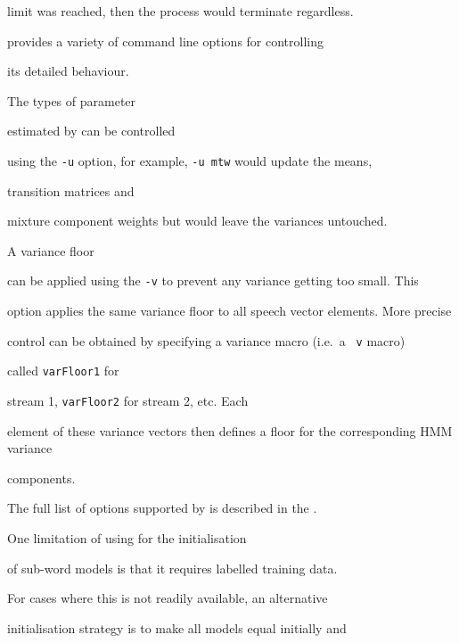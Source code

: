 limit was reached, then the process would terminate regardless.





 provides a variety of command line options for controlling 


its detailed behaviour.




The types of parameter 


estimated by  can be controlled


using the \texttt{-u} option, for example, \texttt{-u mtw} would update the means, 


transition matrices and


mixture component weights but would leave the variances untouched.  


A variance floor


can be applied using the \texttt{-v} to prevent any variance getting too small.   This


option applies the same variance floor to all speech vector elements.  More precise


control can be obtained by specifying a variance macro (i.e.\ a \texttt{~v} macro)


called \texttt{varFloor1} for 


stream 1, \texttt{varFloor2} for stream 2, etc.  Each


element of these variance vectors then defines a floor for the corresponding HMM variance


components.





The full list of options supported by  is described in the .










One limitation of using  for the initialisation


of sub-word models is that it requires labelled training data.


For cases where this is not readily available, an alternative


initialisation strategy is to make all models equal initially and


